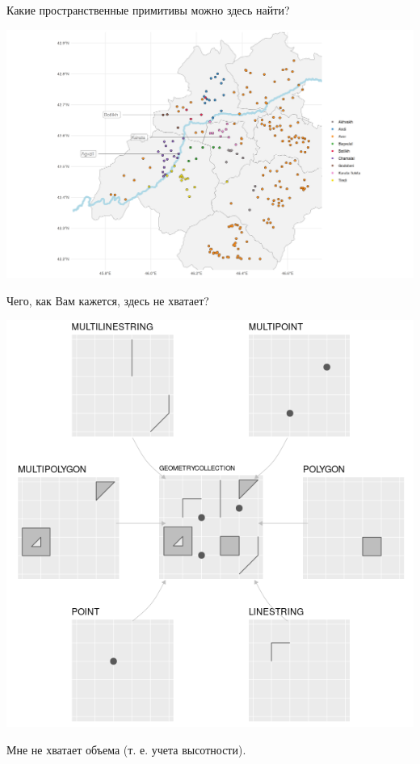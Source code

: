 \documentclass[
  ignorenonframetext,
  t]{beamer}
\begin{document}
\begin{frame}{Какие пространственные примитивы можно здесь найти?}
\label{ux43aux430ux43aux438ux435-ux43fux440ux43eux441ux442ux440ux430ux43dux441ux442ux432ux435ux43dux43dux44bux435-ux43fux440ux438ux43cux438ux442ux438ux432ux44b-ux43cux43eux436ux43dux43e-ux437ux434ux435ux441ux44c-ux43dux430ux439ux442ux438}
\begin{center}
\includegraphics[width=1.15\linewidth,height=\textheight,keepaspectratio]{images/02_dagestan.png}
\end{center}
\end{frame}

\begin{frame}{Чего, как Вам кажется, здесь не хватает?}
\label{ux447ux435ux433ux43e-ux43aux430ux43a-ux432ux430ux43c-ux43aux430ux436ux435ux442ux441ux44f-ux437ux434ux435ux441ux44c-ux43dux435-ux445ux432ux430ux442ux430ux435ux442}
\begin{center}
\includegraphics[width=0.65\linewidth,height=\textheight,keepaspectratio]{images/01_geometries.png}
\end{center}

\pause

Мне не хватает объема (т. е. учета высотности).
\end{frame}
\end{document}
